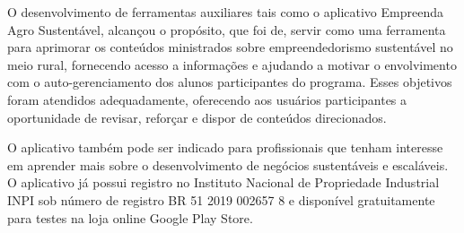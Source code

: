 O desenvolvimento de ferramentas auxiliares tais como o aplicativo Empreenda Agro Sustentável, alcançou o propósito, que foi de, servir como uma ferramenta para aprimorar os conteúdos ministrados sobre empreendedorismo sustentável no meio rural, fornecendo acesso a informações e ajudando a motivar o envolvimento com o auto-gerenciamento dos alunos participantes do programa. Esses objetivos foram atendidos adequadamente, oferecendo aos usuários participantes a oportunidade de revisar, reforçar e dispor de conteúdos direcionados. 

O aplicativo também pode ser indicado para profissionais que tenham interesse em aprender mais sobre o desenvolvimento de negócios sustentáveis e escaláveis. O aplicativo já possui registro no Instituto Nacional de Propriedade Industrial INPI sob número de registro BR 51 2019 002657 8 e disponível gratuitamente para testes na loja online Google Play Store.
